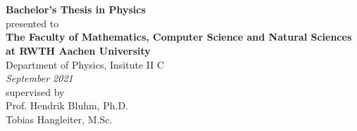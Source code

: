 \begin{titlepage}
    \begin{center}
        {\Large
        \begingroup
        \color{rwthBlue100}
        \\ 
        \endgroup
        \vspace{1cm}
        \\
        }
        \vspace{7cm}
        \textbf{Bachelor's Thesis in Physics}\\
        \vspace{1cm}
        presented to\\
        \vspace{1cm}
        \textbf{The Faculty of Mathematics, Computer Science and Natural Sciences at RWTH Aachen University}\\
        Department of Physics, Insitute II C\\
        \vspace{.5cm}
        \textit{September 2021}\\
        \vspace{1cm}
        supervised by\\
        \vspace{1cm}
        Prof. Hendrik Bluhm, Ph.D.\\
        Tobias Hangleiter, M.Sc.\\
    \end{center}
\end{titlepage}
